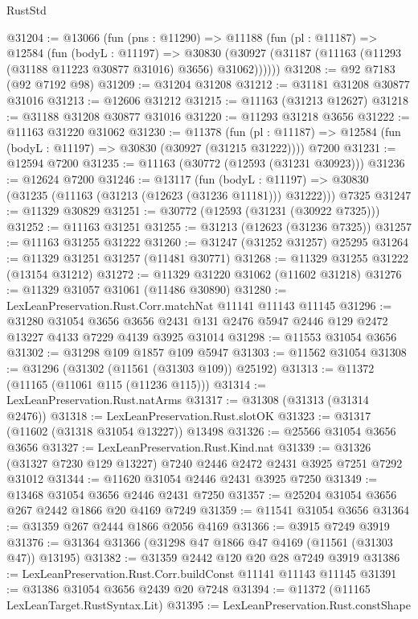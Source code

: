 \begin{lexlean}{RustStd}
\begin{coremodule}
@31204 := @13066
    (fun (pns : @11290) =>
    @11188
      (fun (pl : @11187) =>
      @12584
        (fun (bodyL : @11197) =>
        @30830 (@30927 (@31187 (@11163 (@11293 (@31188 @11223 @30877 @31016) @3656) @31062))))))
@31208 := @92 @7183 (@92 @7192 @98)
@31209 := @31204 @31208
@31212 := @31181 @31208 @30877 @31016
@31213 := @12606 @31212
@31215 := @11163 (@31213 @12627)
@31218 := @31188 @31208 @30877 @31016
@31220 := @11293 @31218 @3656
@31222 := @11163 @31220 @31062
@31230 := @11378
    (fun (pl : @11187) => @12584 (fun (bodyL : @11197) => @30830 (@30927 (@31215 @31222))))
    @7200
@31231 := @12594 @7200
@31235 := @11163 (@30772 (@12593 (@31231 @30923)))
@31236 := @12624 @7200
@31246 := @13117
    (fun (bodyL : @11197) => @30830 (@31235 (@11163 (@31213 (@12623 (@31236 @11181))) @31222)))
    @7325
@31247 := @11329 @30829
@31251 := @30772 (@12593 (@31231 (@30922 @7325)))
@31252 := @11163 @31251
@31255 := @31213 (@12623 (@31236 @7325))
@31257 := @11163 @31255 @31222
@31260 := @31247 (@31252 @31257) @25295
@31264 := @11329 @31251 @31257 (@11481 @30771)
@31268 := @11329 @31255 @31222 (@13154 @31212)
@31272 := @11329 @31220 @31062 (@11602 @31218)
@31276 := @11329 @31057 @31061 (@11486 @30890)
@31280 := LexLeanPreservation.Rust.Corr.matchNat @11141 @11143 @11145
@31296 := @31280
    @31054
    @3656
    @3656
    @2431
    @131
    @2476
    @5947
    @2446
    @129
    @2472
    @13227
    @4133
    @7229
    @4139
    @3925
    @31014
@31298 := @11553 @31054 @3656
@31302 := @31298 @109 @1857 @109 @5947
@31303 := @11562 @31054
@31308 := @31296 (@31302 (@11561 (@31303 @109)) @25192)
@31313 := @11372 (@11165 (@11061 @115 (@11236 @115)))
@31314 := LexLeanPreservation.Rust.natArms
@31317 := @31308 (@31313 (@31314 @2476))
@31318 := LexLeanPreservation.Rust.slotOK
@31323 := @31317 (@11602 (@31318 @31054 @13227)) @13498
@31326 := @25566 @31054 @3656 @3656
@31327 := LexLeanPreservation.Rust.Kind.nat
@31339 := @31326 (@31327 @7230 @129 @13227) @7240 @2446 @2472 @2431 @3925 @7251 @7292 @31012
@31344 := @11620 @31054 @2446 @2431 @3925 @7250
@31349 := @13468 @31054 @3656 @2446 @2431 @7250
@31357 := @25204 @31054 @3656 @267 @2442 @1866 @20 @4169 @7249
@31359 := @11541 @31054 @3656
@31364 := @31359 @267 @2444 @1866 @2056 @4169
@31366 := @3915 @7249 @3919
@31376 := @31364 @31366 (@31298 @47 @1866 @47 @4169 (@11561 (@31303 @47)) @13195)
@31382 := @31359 @2442 @120 @20 @28 @7249 @3919
@31386 := LexLeanPreservation.Rust.Corr.buildConst @11141 @11143 @11145
@31391 := @31386 @31054 @3656 @2439 @20 @7248
@31394 := @11372 (@11165 LexLeanTarget.RustSyntax.Lit)
@31395 := LexLeanPreservation.Rust.constShape

\end{coremodule}
\end{lexlean}
